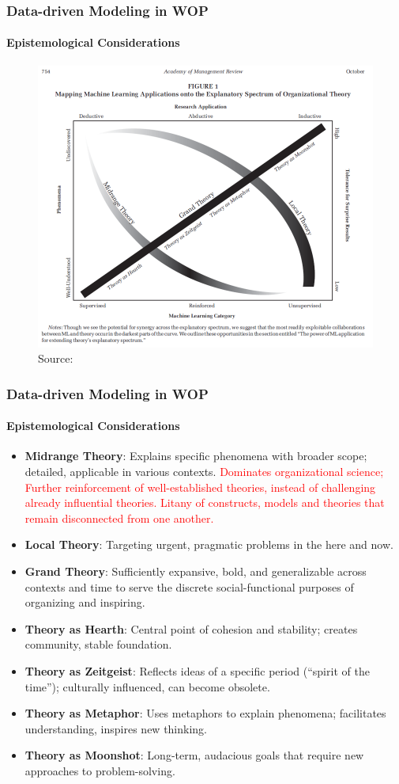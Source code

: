 \documentclass{beamer}
\begin{document}
\begin{frame}
	\frametitle{Data-driven Modeling in WOP}
	\framesubtitle{Epistemological Considerations}
	\begin{figure}
		\centering
		\includegraphics[width=0.75\linewidth]{figs/Leavitt_2021_Fig1.png}
		\caption{Source: \textcite[]{leavitt2021}}
		\label{fig:Leavitt_2021_Fig1}
	\end{figure}
\end{frame}


\begin{frame}
\frametitle{Data-driven Modeling in WOP}
\framesubtitle{Epistemological Considerations}
	{\footnotesize
	\begin{itemize}
		\item \textbf{Midrange Theory}: Explains specific phenomena with broader scope; detailed, applicable in various contexts. \textcolor{red}{Dominates organizational science; Further reinforcement of well-established	theories, instead of challenging already influential theories. Litany of constructs, models and theories that remain disconnected from one another.}
		\item \textbf{Local Theory}: Targeting urgent, pragmatic problems in the here and now.
		\item \textbf{Grand Theory}: Sufficiently expansive, bold, and generalizable across contexts and time to serve the discrete social-functional purposes of organizing and inspiring.
		\item \textbf{Theory as Hearth}: Central point of cohesion and stability; creates community, stable foundation.
		\item \textbf{Theory as Zeitgeist}: Reflects ideas of a specific period (``spirit of the time''); culturally influenced, can become obsolete.
		\item \textbf{Theory as Metaphor}: Uses metaphors to explain phenomena; facilitates understanding, inspires new thinking.
		\item \textbf{Theory as Moonshot}: Long-term, audacious goals that require new approaches to problem-solving.
    \end{itemize}
	}
\end{frame}
\end{document}
